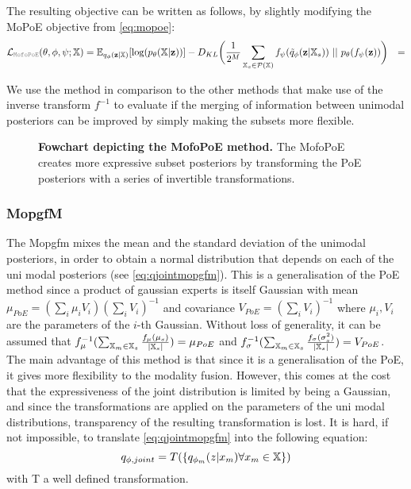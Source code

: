 The resulting objective can be written as follows, by slightly modifying the MoPoE objective from \cref{eq:mopoe}:
\begin{equation}
    \begin{split}
    \mathcal{L}_{\mg{MofoPoE}}(\theta, \phi, \psi; \xset) &=  \mathbb{E}_{q_{\phi}(\textbf{z}|\mathbb{X})}[\log (p_{\theta}(\mathbb{X}|\textbf{z}))] - D_{KL}\biggl( \frac{1}{2^M} \sum _{\mathbb{X}_s \in \mathcal{P}(\mathbb{X})} f_{\psi}(\tilde{q}_{\phi}(\textbf{z}|\mathbb{X}_s))\ ||\ p_{\theta}(f_{\psi}(\textbf{z}))\biggr)
        &=
    \end{split}
\end{equation}

We use the  method in comparison to the other methods that make use of the inverse transform $f^{-1}$ to evaluate if the merging of information between unimodal posteriors can be improved by simply making the subsets more flexible. %

\begin{figure}[h!]
    \centering
    \caption{\textbf{Fowchart depicting the MofoPoE method.} The MofoPoE creates more expressive subset posteriors by transforming the PoE posteriors with a series of invertible transformations.}
    \label{fig:mofopoe}
\end{figure}

\subsubsection{MopgfM}\label{subsec:mopgfm}
The Mopgfm mixes the mean and the standard deviation of the unimodal posteriors, in order to obtain a normal distribution that depends on each of the uni modal posteriors (see \cref{eq:qjointmopgfm}).
This is a generalisation of the PoE method since a product of gaussian experts is itself Gaussian with mean $\mu_{PoE} = (\sum _i \mu _i V_i)(\sum _i V_i)^{-1}$ and covariance $V_{PoE}= (\sum _i V_i)^{-1}$ where $\mu _i, V_i$ are the parameters of the $i$-th Gaussian.
Without loss of generality, it can be assumed that $f_{\mu}^{-1}(\sum _{\mathbb{X}_m \in \mathbb{X}_s} \frac{f_{\mu}(\mu_s)}{|\mathbb{X}_s|}) = \mu_{PoE}$ and $f_{\sigma}^{-1}(\sum  _{\mathbb{X}_m \in \mathbb{X}_s} \frac{f_{\sigma}(\sigma_s^2)}{|\mathbb{X}_s|}) = V_{PoE}$.
The main advantage of this method is that since it is a generalisation of the PoE, it gives more flexibility to the modality fusion.
However, this comes at the cost that the expressiveness of the joint distribution is limited by being a Gaussian, and since the transformations are applied on the parameters of the uni modal distributions, transparency of the resulting transformation is lost.
It is hard, if not impossible, to translate \cref{eq:qjointmopgfm} into the following equation:
\begin{equation}
    q_{\phi, joint} = T(\{q_{\phi _m}(z|x_m) \forall x_m \in \mathbb{X}\})
\end{equation}
with T a well defined transformation.

